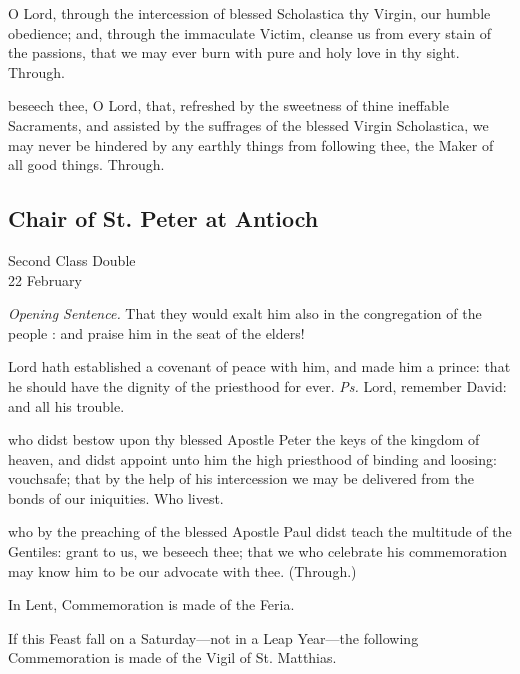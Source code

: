 \secret
{} O Lord, through the intercession of blessed Scholastica thy Virgin, our humble obedience; and, through the immaculate Victim, cleanse us from every stain of the passions, that we may ever burn with pure and holy love in thy sight. Through.


\postcommunion
{} beseech thee, O Lord, that, refreshed by the sweetness of thine ineffable Sacraments, and assisted by the suffrages of the blessed Virgin Scholastica, we may never be hindered by any earthly things from following thee, the Maker of all good things. Through.


\clearpage
\subsection{Chair of St. Peter at Antioch}
\begin{inhead}
    {Second Class Double\\
22 February}
\end{inhead}
\par\noindent
\textit{Opening Sentence.} That they would exalt him also in the congregation of the people : and praise him in the seat of the elders!

\introit
{} Lord hath established a covenant of peace with him, and made him a prince: that he should have the dignity of the priesthood for ever. \textit{Ps.} Lord, remember David: and all his trouble.

\collect
{} who didst bestow upon thy blessed Apostle Peter the keys of the kingdom of heaven, and didst appoint unto him the high priesthood of binding and loosing: vouchsafe; that by the help of his intercession we may be delivered from the bonds of our iniquities. Who livest.

 who by the preaching of the blessed Apostle Paul didst teach the multitude of the Gentiles: grant to us, we beseech thee; that we who celebrate his commemoration may know him to be our advocate with thee. (Through.)
\begin{rubric}
    In Lent, Commemoration is made of the Feria.%
\end{rubric}
\begin{rubric}
    If this Feast fall on a Saturday---not in a Leap Year---the following Commemoration is made of the Vigil of St. Matthias.
\end{rubric}


